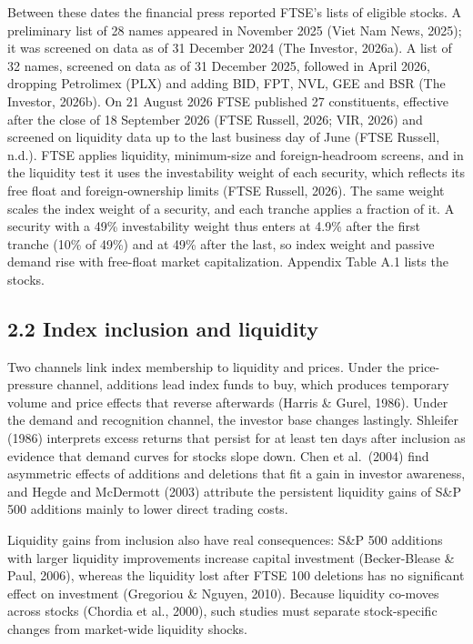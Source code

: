 \documentclass[review,authoryear,12pt]{elsarticle}
\begin{document}
Between these dates the financial press reported FTSE's lists of
eligible stocks. A preliminary list of 28 names appeared in November
2025 (Viet Nam News, 2025); it was screened on data as of 31 December
2024 (The Investor, 2026a). A list of 32 names, screened on data as of
31 December 2025, followed in April 2026, dropping Petrolimex (PLX) and
adding BID, FPT, NVL, GEE and BSR (The Investor, 2026b). On 21 August
2026 FTSE published 27 constituents, effective after the close of 18
September 2026 (FTSE Russell, 2026; VIR, 2026) and screened on liquidity
data up to the last business day of June (FTSE Russell, n.d.). FTSE
applies liquidity, minimum-size and foreign-headroom screens, and in the
liquidity test it uses the investability weight of each security, which
reflects its free float and foreign-ownership limits (FTSE Russell,
2026). The same weight scales the index weight of a security, and each
tranche applies a fraction of it. A security with a 49\% investability
weight thus enters at 4.9\% after the first tranche (10\% of 49\%) and
at 49\% after the last, so index weight and passive demand rise with
free-float market capitalization. Appendix Table A.1 lists the stocks.

\hypertarget{index-inclusion-and-liquidity}{%
\subsection*{2.2 Index inclusion and
liquidity}}

Two channels link index membership to liquidity and prices. Under the
price-pressure channel, additions lead index funds to buy, which
produces temporary volume and price effects that reverse afterwards
(Harris \& Gurel, 1986). Under the demand and recognition channel, the
investor base changes lastingly. Shleifer (1986) interprets excess
returns that persist for at least ten days after inclusion as evidence
that demand curves for stocks slope down. Chen et al.~(2004) find
asymmetric effects of additions and deletions that fit a gain in
investor awareness, and Hegde and McDermott (2003) attribute the
persistent liquidity gains of S\&P 500 additions mainly to lower direct
trading costs.

Liquidity gains from inclusion also have real consequences: S\&P 500
additions with larger liquidity improvements increase capital investment
(Becker-Blease \& Paul, 2006), whereas the liquidity lost after FTSE 100
deletions has no significant effect on investment (Gregoriou \& Nguyen,
2010). Because liquidity co-moves across stocks (Chordia et al., 2000),
such studies must separate stock-specific changes from market-wide
liquidity shocks.
\end{document}
